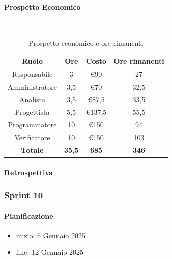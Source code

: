 \documentclass{article}
\begin{document}
                \paragraph{Prospetto Economico}\mbox{}\\
                \begin{table}[H]
                    \centering
                    \begin{tabular}{|c|c|c|c|}
                    \hline
                    \textbf{Ruolo}  & \textbf{Ore}  & \textbf{Costo} & \textbf{Ore rimanenti} \\ \hline
                    Responsabile    & 3             & €90            & 27                     \\ \hline
                    Amministratore  & 3,5           & €70            & 32,5                   \\ \hline
                    Analista        & 3,5           & €87,5          & 33,5                   \\ \hline
                    Progettista     & 5,5           & €137,5         & 55,5                   \\ \hline
                    Programmatore   & 10            & €150           & 94                    \\ \hline
                    Verificatore    & 10            & €150           & 103                    \\ \hline
                    \textbf{Totale} & \textbf{35,5} & \textbf{685}   & \textbf{346}         \\ \hline
                    \end{tabular}
                    \caption{Prospetto economico e ore rimanenti}
                \end{table}

                \paragraph{Retrospettiva}
            \subsubsection{Sprint 10}
                \paragraph{Pianificazione}
                \begin{itemize}
                    \item inizio: 6 Gennaio 2025
                    \item fine: 12 Gennaio 2025
                \end{itemize}
\end{document}
